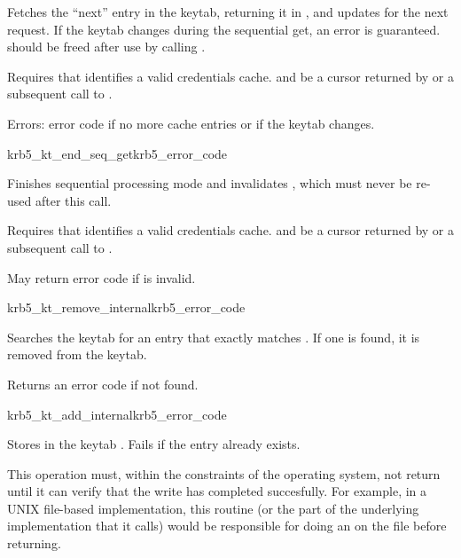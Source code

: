 Fetches the ``next'' entry in the keytab, returning it in
, and updates  for the next
request.  If the keytab changes during the sequential get, an error is
guaranteed.   should be freed after use by calling
.

Requires that  identifies a valid credentials cache.  and
 be a cursor returned by
 or a subsequent call to
.

Errors: error code if no more cache entries or if the keytab changes.

\begin{funcdecl}{krb5_kt_end_seq_get}{krb5_error_code}{\funcin}
\end{funcdecl}

Finishes sequential processing mode and invalidates ,
which must never be re-used after this call.

Requires that  identifies a valid credentials cache.  and
 be a cursor returned by
 or a subsequent call to
.

May return error code if  is invalid.

\begin{funcdecl}{krb5_kt_remove_internal}{krb5_error_code}{\funcin}
\end{funcdecl}

Searches the keytab  for an entry that exactly matches
.  If one is found, it is removed from the keytab.

Returns an error code if not found.

	
\begin{funcdecl}{krb5_kt_add_internal}{krb5_error_code}{\funcin}
\end{funcdecl}

Stores  in the keytab .
Fails if the entry already exists.

This operation must, within the constraints of the operating system, not
return until it can verify that the write has completed succesfully.
For example, in a UNIX file-based implementation, this routine (or the part
of the underlying implementation that it calls) would be responsible for
doing an  on the file before returning.


